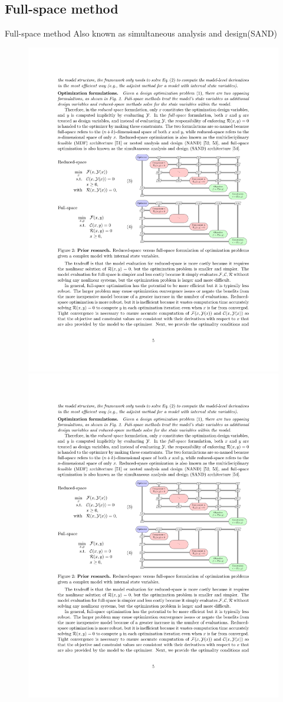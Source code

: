 \documentclass{beamer}
\begin{document}
\subsection{Full-space method}
  \begin{frame}{Full-space method}
    Also known as simultaneous analysis and design(SAND)
    \begin{figure}[ht]
      \centering
      \vspace{0mm}
      \includegraphics[width=.9\linewidth]{Figures/full_space}
      \includegraphics[width=.25\linewidth]{Figures/full_space_eqns}
      \vspace{-5mm}
      \label{fig:model_evals}
    \end{figure}
  \end{frame}
\end{document}
